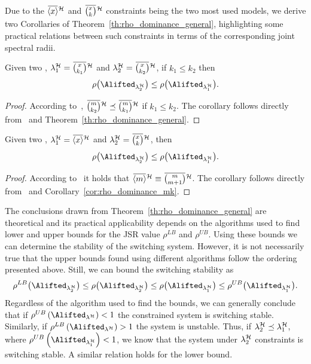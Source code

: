 Due to the $\overbar{\left< x \right>}^{\strat}$ and $\eanymiss{}{\strat}$ constraints being the two most used models, we derive two Corollaries of Theorem~\ref{th:rho_dominance_general}, highlighting some practical relations between such constraints in terms of the corresponding joint spectral radii.
\begin{corollary}%
    \label{cor:rho_dominance_mk}%
    Given two \ewhc{}, $\lambda^\strat_1 = \overbar{\binom{x}{k_1}}^{\strat}$ and $\lambda^\strat_2 = \overbar{\binom{x}{k_2}}^{\strat}$, if $k_1 \leq k_2$ then
    $$
        \rho\bigl(\Alifted_{\lambda^\strat_2}\bigr) \leq \rho\bigl(\Alifted_{\lambda^\strat_1}\bigr).
    $$
%
    \begin{proof}
        According to~\cite{Wu:2020}, $\overbar{\binom{m}{k_2}}^{\strat}\preceq\overbar{\binom{m}{k_1}}^{\strat}$ if $k_1 \leq k_2$.
        The corollary follows directly from~\cite{Wu:2020} and Theorem~\ref{th:rho_dominance_general}.
    \end{proof}
\end{corollary}
%
\begin{corollary}%
    \label{cor:rho_dominance_cons}%
    Given two \ewhc{}, $\lambda^\strat_1 = \overbar{\left<x\right>}^{\strat}$ and $\lambda^\strat_2 =\eanymiss{}{\strat}$, then
    $$
        \rho\bigl(\Alifted_{\lambda^\strat_2}\bigr) \leq \rho\bigl(\Alifted_{\lambda^\strat_1}\bigr).
    $$
%
    \begin{proof}
        According to~\cite{Maggio:2020} it holds that $\overbar{\left<m\right>}^{\strat} \equiv\overbar{\binom{m}{m+1}}^{\strat}$.
        The corollary follows directly from~\cite{Maggio:2020} and Corollary~\ref{cor:rho_dominance_mk}.
    \end{proof}
\end{corollary}
%
The conclusions drawn from Theorem~\ref{th:rho_dominance_general} are theoretical and its practical applicability depends on the algorithms used to find lower and upper bounds for the JSR value $\rho^{LB}$ and $\rho^{UB}$.
Using these bounds we can determine the stability of the switching system.
However, it is not necessarily true that the upper bounds found using different algorithms follow the ordering presented above.
Still, we can bound the switching stability as
%
$$
\rho^{LB} \bigl( \Alifted_{\lambda^\strat_2} \bigr) \leq \rho \bigl( \Alifted_{\lambda^\strat_2}
\bigr) \leq \rho \bigl( \Alifted_{\lambda^\strat_1} \bigr) \leq \rho^{UB} \bigl(
\Alifted_{\lambda^\strat_1} \bigr).
$$
%
Regardless of the algorithm used to find the bounds, we can generally conclude that if $\rho^{UB} \left( \Alifted_{\lambda^\strat} \right) < 1$ the constrained system is switching stable.
Similarly, if $\rho^{LB} \left( \Alifted_{\lambda^\strat} \right) > 1$ the system is unstable.
Thus, if $\lambda^{\mathcal{H}}_2 \preceq \lambda^{\mathcal{H}}_1$, where $\rho^{UB} \left( \Alifted_{\lambda^\strat_1} \right) < 1$, we know that the system under $\lambda^{\mathcal{H}}_2$ constraints is switching stable.
A similar relation holds for the lower bound.

